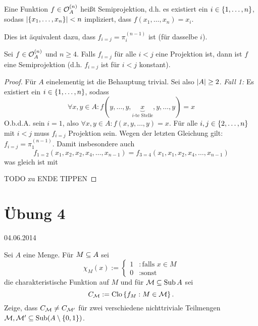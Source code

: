 \documentclass{book}
\begin{document}
\begin{definition}[Semiprojektion]
    Eine Funktion $f\in\mathcal{O}_A^{(n)}$ heißt Semiprojektion, d.h. es existiert ein $i\in\left\{1,\ldots,n\right\}$, sodass $\left|\left\{x_1,\ldots,x_n\right\}\right|<n$ impliziert, dass $f(x_1,\ldots,x_n)=x_i$.
\end{definition}

\begin{remark}
    Dies ist äquivalent dazu, dass $f_{i=j}=\pi_i^{(n-1)}$ ist (für dasselbe $i$).
\end{remark}

\begin{lemma}\label{semi-proj-unique-proj}
    Sei $f\in\mathcal{O}_A^{(n)}$ und $n\geq 4$. Falls $f_{i=j}$ für alle $i<j$ eine Projektion ist, dann ist $f$ eine Semiprojektion (d.h. $f_{i=j}$ ist für $i<j$ konstant).
\end{lemma}

\begin{proof}
    Für $A$ einelementig ist die Behauptung trivial. Sei also $\left|A\right|\geq 2$.
    \emph{Fall 1:} Es existiert ein $i\in\left\{1,\ldots,n\right\}$, sodass
    $$
    \forall x,y\in A: f(y,\ldots,y,\underbrace{x}_{\textrm{$i$-te Stelle}},y,\ldots,y)=x
    $$
    O.b.d.A. sein $i=1$, also $\forall x,y\in A:f(x,y,\ldots,y)=x$.
    Für alle $i,j\in\left\{2,\ldots,n\right\}$ mit $i<j$ muss $f_{i=j}$ Projektion sein. Wegen der letzten Gleichung gilt: $f_{i=j}=\pi_1^{(n-1)}$. Damit insbesondere auch
    $$
    f_{1=2}(x_1,x_2,x_2,x_4,\ldots,x_{n-1})=f_{3=4}(x_1,x_1,x_2,x_4,\ldots,x_{n-1})
    $$
    was gleich ist mit
  
    TODO zu ENDE TIPPEN
\end{proof}

\section{Übung 4}\hfill 04.06.2014

\begin{exercise}
    Sei $A$ eine Menge. Für $M\subseteq A$ sei
    $$
    \chi_M(x):=
    \begin{cases}
        1 &: \textrm{falls $x\in M$}\\
        0 &: \textrm{sonst}
    \end{cases}
    $$
    die charakteristische Funktion auf $M$ und für $\mathcal{M}\subseteq\mathop\mathrm{Sub}\nolimits A$ sei
    $$
    C_{\mathcal{M}} := \mathrm{Clo}\left\{f_M:M\in\mathcal{M}\right\}.
    $$
    Zeige, dass $C_{\mathcal{M}}\neq C_{\mathcal{M}'}$ für zwei verschiedene nichttriviale Teilmengen $\mathcal{M},\mathcal{M}'\subseteq \mathop\mathrm{Sub}\nolimits(A\setminus\left\{0,1\right\})$.
\end{exercise}
\end{document}
